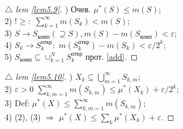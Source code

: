 
\begin{minipage}[t]{0.45\textwidth}
\begin{proof}[
{$\triangle$} 
lem \eqref{lem5.9}]

\phantom{42}

) Очев. $\mu^*(S) \leq m(S)$;\\
2) $!\geq:$ $\sum\nolimits_{ k=1 }^{ \infty } m(S_k)<m(S)$;\\
3) $S\to S_\text{комп} (\supseteq S), m(S)-m(S_\text{комп}) < \varepsilon$;\\
4) $S_k \to S_k^\text{откр}:$ $m(S_k^\text{откр})- m(S_k)<\varepsilon/2^k$;\\
5) $S_\text{комп} \subseteq \cup_{k=1}^N S_k^\text{откр}$ 
прот. \eqref{add}.
\end{proof}
\end{minipage}  
\hfill
\begin{minipage}[t]{0.45\textwidth}
\begin{proof}[
{$\triangle$} 
lem \eqref{lem5.10}]

\phantom{42}

) $X_k \subseteq \bigcup_{m=1}^\infty S_{k,m}$;\\
2) $\varepsilon > 0$ $ \sum\nolimits_{ k,m=1 }^{ \infty } m(S_{k,m}) \leq \mu^*(X_k) + \varepsilon/2^k$;\\
3) Def: $\mu^*(X) \leq \sum\nolimits_{ k,m=1 }^{ \infty } m(S_{k,m})$;\\
4) (2), (3) $\Rightarrow$ $\mu^*(X) \leq \sum_k \mu^*(X_k) + \varepsilon$.
\end{proof}
\end{minipage}  